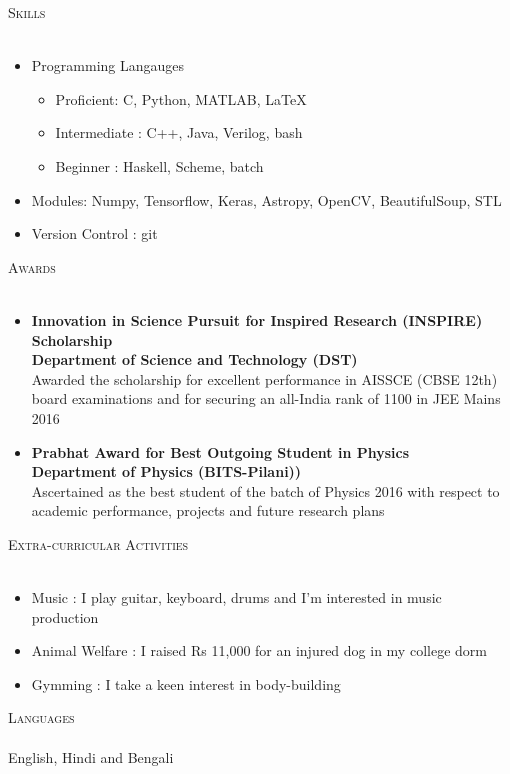 \documentclass[a4paper]{article}
\newcommand{\lineunder} {
    \vspace*{-8pt} \\
    \hspace*{-18pt} \hrulefill \\
}
\newcommand{\header} [1] {
    {\hspace*{-18pt}\vspace*{6pt} \textsc{#1}}
    \vspace*{-6pt} \lineunder
}
\begin{document}
\newpage

\header{Skills}
\begin{itemize}
	\item Programming Langauges
	\begin{itemize}
	    \item Proficient: C, Python, MATLAB, \LaTeX
	    \item Intermediate : C++, Java, Verilog, bash
	    \item Beginner : Haskell, Scheme, batch
	\end{itemize}
	\item Modules: Numpy, Tensorflow, Keras, Astropy, OpenCV, BeautifulSoup, STL
	\item Version Control : git
\end{itemize}
\vspace{2mm}

\header{Awards}
\begin{itemize}
    \item \textbf{Innovation in Science Pursuit for Inspired Research (INSPIRE) Scholarship} \\ \textbf{Department of Science and Technology (DST)}\\ \vspace{2mm}
Awarded the scholarship for excellent performance in AISSCE (CBSE 12th) board examinations and for securing an all-India rank of 1100 in JEE Mains 2016\\

    \item \textbf{Prabhat Award for Best Outgoing Student in Physics}  \\ \textbf{Department of Physics (BITS-Pilani))}\\ \vspace{2mm}
Ascertained as the best student of the batch of Physics 2016 with respect to academic performance, projects and future research plans
\end{itemize}


\header{Extra-curricular Activities}
\begin{itemize}
    \item Music : I play guitar, keyboard, drums and I'm interested in music production
    \item Animal Welfare : I raised Rs 11,000 for an injured dog in my college dorm
    \item Gymming : I take a keen interest in body-building
\end{itemize}
\vspace*{2mm}

\header{Languages}
English, Hindi and Bengali
\vspace*{2mm}

\ 
\end{document}
